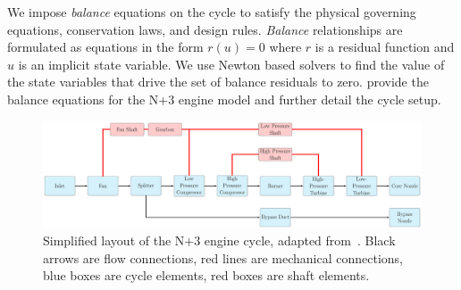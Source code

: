 \documentclass[conf]{new-aiaa}
\begin{document}

We impose \emph{balance} equations on the cycle to satisfy the physical governing equations, conservation laws, and design rules.
\emph{Balance} relationships are formulated as equations in the form $r(u)=0$ where $r$ is a residual function and $u$ is an implicit state variable.
We use Newton based solvers to find the value of the state variables that drive the set of balance residuals to zero.
\citeauthor{Hendricks2019} provide the balance equations for the N+3 engine model and further detail the cycle setup.


\begin{figure}[hbt!]
    \centering
    \includegraphics[width=1.0\textwidth]{N3_cycle.pdf}
    \caption{
        Simplified layout of the N+3 engine cycle, adapted from~\citet{Hendricks2019}.
        Black arrows are flow connections, red lines are mechanical connections, blue boxes are cycle elements, red boxes are shaft elements.
    }
    \label{fig:N3_original}
\end{figure}

\end{document}
